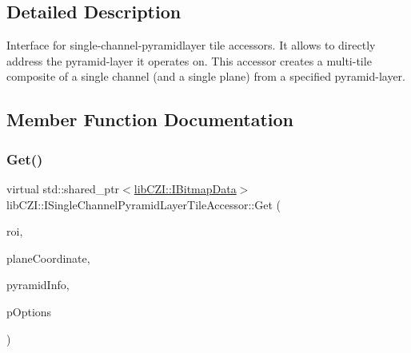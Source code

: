 \subsection{Detailed Description}
Interface for single-\/channel-\/pyramidlayer tile accessors. It allows to directly address the pyramid-\/layer it operates on. This accessor creates a multi-\/tile composite of a single channel (and a single plane) from a specified pyramid-\/layer. 

\subsection{Member Function Documentation}
\mbox{\label{classlib_c_z_i_1_1_i_single_channel_pyramid_layer_tile_accessor_ac4dd5b960114aa8f87773734d9d78dd3}} 
\subsubsection{\texorpdfstring{Get()}{Get()}\hspace{0.1cm}{\footnotesize\ttfamily [1/3]}}
{\footnotesize\ttfamily virtual std\+::shared\+\_\+ptr$<$\hyperlink{classlib_c_z_i_1_1_i_bitmap_data}{lib\+C\+Z\+I\+::\+I\+Bitmap\+Data}$>$ lib\+C\+Z\+I\+::\+I\+Single\+Channel\+Pyramid\+Layer\+Tile\+Accessor\+::\+Get (\begin{DoxyParamCaption}\item[{const \hyperlink{structlib_c_z_i_1_1_int_rect}{lib\+C\+Z\+I\+::\+Int\+Rect} \&}]{roi,  }\item[{const \hyperlink{classlib_c_z_i_1_1_i_dim_coordinate}{lib\+C\+Z\+I\+::\+I\+Dim\+Coordinate} $\ast$}]{plane\+Coordinate,  }\item[{const \hyperlink{structlib_c_z_i_1_1_i_single_channel_pyramid_layer_tile_accessor_1_1_pyramid_layer_info}{Pyramid\+Layer\+Info} \&}]{pyramid\+Info,  }\item[{const \hyperlink{structlib_c_z_i_1_1_i_single_channel_pyramid_layer_tile_accessor_1_1_options}{lib\+C\+Z\+I\+::\+I\+Single\+Channel\+Pyramid\+Layer\+Tile\+Accessor\+::\+Options} $\ast$}]{p\+Options }\end{DoxyParamCaption})\hspace{0.3cm}{\ttfamily [pure virtual]}}

